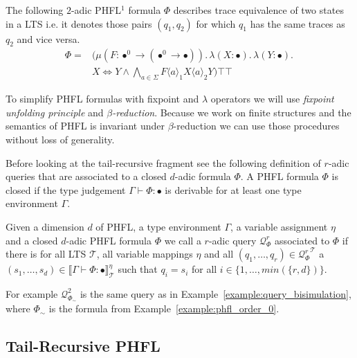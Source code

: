 \begin{example}{\cite{lange2014capturing}}
    \label{example:phfl_order_2}
    The following $2$-adic PHFL$^1$ formula $\Phi$ describes trace equivalence of two states in a LTS i.e. it denotes
    those pairs $(q_1, q_2)$ for which $q_1$ has the same traces as $q_2$ and vice versa.
    \begin{align*}
        \Phi = &(\mu (F \colon \bullet^0 \rightarrow (\bullet^0 \rightarrow \bullet)).\,
        \lambda (X \colon \bullet).\, \lambda (Y \colon \bullet).\, \\&X \Leftrightarrow Y \wedge
        \underset{a \in \Sigma}{\bigwedge} F \langle a \rangle_1 X \langle a \rangle_2 Y)\top \top
    \end{align*}
\end{example}

\begin{remark}
To simplify PHFL formulas with fixpoint and $\lambda$ operators we will use \emph{fixpoint unfolding principle} and \emph{$\beta$-reduction}. Because we work on finite structures and the semantics of PHFL is invariant under $\beta$-reduction we can use those procedures without loss of generality.
\end{remark}

Before looking at the tail-recursive fragment see the following definition of $r$-adic queries that are associated to a
closed $d$-adic formula $\Phi$. A PHFL formula $\Phi$ is closed if the type judgement $\Gamma \vdash \Phi \colon \bullet$ is derivable for at least one type environment $\Gamma$.

\begin{definition}
\label{definition:query_associated_to_formula}
    Given a dimension $d$ of PHFL, a type environment $\Gamma$, a variable assignment $\eta$ and a closed $d$-adic PHFL
    formula $\Phi$ we call a $r$-adic query $\mathcal{Q}^r_\Phi$ associated to $\Phi$ if there is for all LTS
    $\mathcal{T}$, all variable mappings $\eta$ and all $(q_1, \dots, q_r) \in {\mathcal{Q}^r_\Phi}^\mathcal{T}$ a $(s_1, \dots, s_d) \in
    \llbracket \Gamma \vdash \Phi \colon \bullet \rrbracket^\eta_\mathcal{T}$ such that $q_i = s_i$ for all $i \in
    \{1, \dots, min(\{r, d\})\}$.
\end{definition}

For example $\mathcal{Q}^2_{\Phi_\sim}$ is the same query as in Example~\ref{example:query_bisimulation}, where
$\Phi_\sim$ is the formula from Example~\ref{example:phfl_order_0}.

\subsection{Tail-Recursive PHFL}\label{subsec:tail-recursivePhfl}


